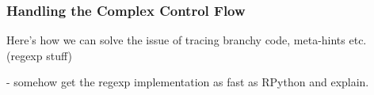 \subsubsection{Handling the Complex Control Flow}
\label{subsubsec:meta-hints}

Here's how we can solve the issue of tracing branchy code, meta-hints
etc. (regexp stuff)

- somehow get the regexp implementation as fast as RPython and explain.
